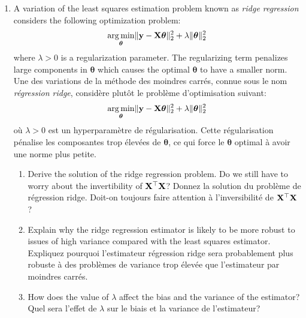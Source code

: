 \documentclass[11pt,french,english]{article}
\newcommand{\french}[1]{ {\color{blue} #1} }
\newcommand{\mat}[1]{{\bf #1}}
\newcommand{\X}{\mat{X}}
\DeclareMathOperator*{\argmin}{arg\,min}
\begin{document}
\begin{enumerate}
\begin{enumerate}
    \item A variation of the least squares estimation problem known as \emph{ridge regression} considers the following optimization problem:
    \begin{equation}
    \argmin_{\boldsymbol{\theta}}
      \lVert {\bf y} - {\bf X}\boldsymbol{\theta} \rVert_2^2
      +  \lambda \lVert \boldsymbol{\theta} \rVert_2^2
    \label{eq:RR}
    \end{equation}
    where $\lambda>0$ is a regularization parameter. The regularizing term penalizes large components in $\boldsymbol{\theta}$ which causes the optimal $\boldsymbol{\theta}$ to have a smaller norm.
    \french{\\ Une des variations de la méthode des moindres carrés, connue sous le nom \emph{régression ridge}, considère plutôt le problème d'optimisation suivant:
    \begin{equation}
    \argmin_{\boldsymbol{\theta}}
      \lVert {\bf y} - {\bf X}\boldsymbol{\theta} \rVert_2^2
      +  \lambda \lVert \boldsymbol{\theta} \rVert_2^2
    \label{eq:RR}
    \end{equation}
    où $\lambda>0$ est un hyperparamètre de régularisation. Cette régularisation pénalise les composantes trop élevées de $\boldsymbol{\theta}$, ce qui force le $\boldsymbol{\theta}$ optimal à avoir une norme plus petite.}
        \begin{enumerate}
        \item{  Derive the solution of the ridge regression problem. Do we still have to worry about the invertibility of $\X^\top \X$? \french{Donnez la solution du problème de régression ridge. Doit-on toujours faire attention à l'inversibilité de $\X^\top \X$?}}
        \item{Explain why the ridge regression estimator is likely to be more robust to issues of high variance compared with the least squares estimator. \french{Expliquez pourquoi l'estimateur régression ridge sera probablement plus robuste à des problèmes de variance trop élevée que l'estimateur par moindres carrés.}}
        \item{ How does the value of $\lambda$ affect the bias and the variance of the estimator? \french{Quel sera l'effet de $\lambda$ sur le biais et la variance de l'estimateur?}}
        \end{enumerate}
        
\end{enumerate}
 \newcommand{\hloo}[1]{h_{D\setminus #1}}
 \newcommand{\simiid}{{\sim \atop \textit{iid}}}


\end{enumerate}
\end{document}

